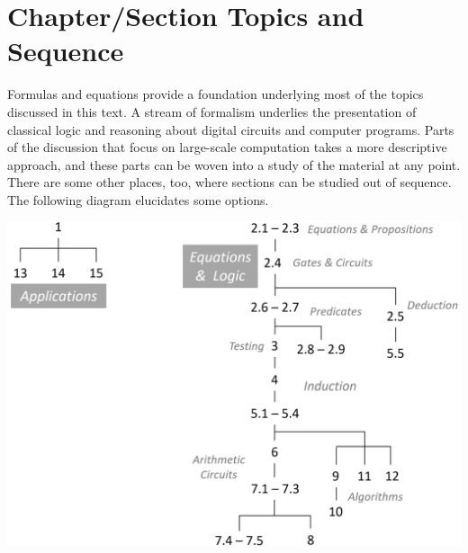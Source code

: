 \chapter{Chapter/Section Topics and Sequence}
\label{ch:roadmap}

Formulas and equations provide a foundation
underlying most of the topics
discussed in this text.
A stream of formalism underlies the presentation of classical logic
and reasoning about digital circuits and computer programs.
Parts of the discussion that focus
on large-scale computation takes a more descriptive approach,
and these parts can be woven into a study of the material
at any point. There are some other places, too, where
sections can be studied out of sequence.
The following diagram elucidates some options.
\vspace{1cm}
\label{diagram:roadmap}
\begin{center}
\includegraphics[scale=0.25]{images/roadmap.png}
\end{center}


